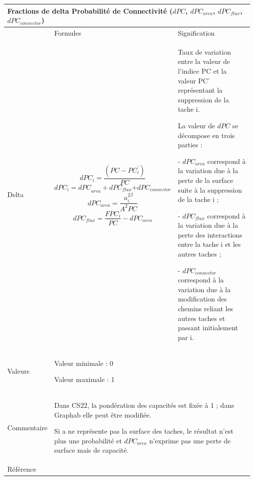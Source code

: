 \documentclass{article}
\begin{document}
\begin{table}[H]
\begin{tabular}{|m{2.2cm}|m{5.5cm}m{7.924cm}|}

\hline
\multicolumn{3}{|m{16.044998cm}|}{Fractions de delta Probabilité de Connectivité ($dPC$, $dPC_{area}$, $dPC_{flux}$, $dPC_{connector}$)}\\\hline
 &
\multicolumn{1}{m{5.229cm}|}{Formules} &
Signification\\\hline
Delta &
\multicolumn{1}{m{5.229cm}|}{\begin{equation*}
{\mathit{dPC}}_{i}=\frac{(\mathit{PC}-{\mathit{PC}}_{i}^{'})}{\mathit{PC}}
\end{equation*}
\begin{equation*}
{{\mathit{dPC}}_{i}=\mathit{dPC}}_{\mathit{area}}+{\mathit{dPC}}_{\mathit{flux}}{+\mathit{dPC}}_{\mathit{connector}}
\end{equation*}
\begin{equation*}
{\mathit{dPC}}_{\mathit{area}}=\frac{{a}_{i}^{2\beta }}{{A}^{2}\mathit{PC}}
\end{equation*}
\begin{equation*}
{dPC}_{flux}=\frac{{FPC}_{i}}{PC}-{dPC}_{area}
\end{equation*}
} &
Taux de variation entre la valeur de l’indice PC et la valeur PC’ représentant la suppression de la tache i.

La valeur de $dPC$ se décompose en trois parties :

{}- $dPC_{area}$ correspond à la variation due à la perte de la surface suite à la suppression de la tache i ;

{}- $dPC_{flux}$ correspond à la variation due à la perte des interactions entre la tache i et les autres taches ;

{}- $dPC_{connector}$ correspond à la variation due à la modification des chemins reliant les autres taches et passant initialement par i.~\\\hline
Valeurs &
\multicolumn{2}{m{13.353cm}|}{Valeur minimale : 0

Valeur maximale : 1

}\\\hline
Commentaire &
\multicolumn{2}{m{13.353cm}|}{Dans CS22, la pondération des capacités est fixée à 1 ; dans Graphab elle peut être modifiée.

Si a ne représente pas la surface des taches, le résultat n’est plus une probabilité et $dPC_{area}$ n’exprime pas une perte de surface mais de capacité.

}\\\hline
Référence &
\multicolumn{2}{m{13.353cm}|}{\cite{Saura2010}}\\\hline
\end{tabular}
\end{table}
\end{document}
